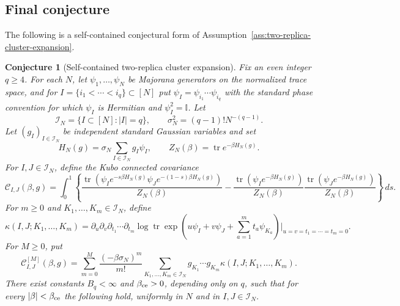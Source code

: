 \documentclass[11pt]{article}
\newtheorem{conjecture}[theorem]{Conjecture}
\newcommand{\tr}{\operatorname{tr}}
\newcommand{\I}{\mathbb{I}}
\newcommand{\calI}{\mathcal{I}}
\newcommand{\dd}{\,d}
\begin{document}
\subsection{Final conjecture}

The following is a self-contained conjectural form of
Assumption~\ref{ass:two-replica-cluster-expansion}.

\begin{conjecture}[Self-contained two-replica cluster expansion]
  \label{conj:self-contained-two-replica-cluster}
  Fix an even integer $q\geq4$.  For each $N$, let
  $\psi_1,\ldots,\psi_N$ be Majorana generators on the normalized trace space,
  and for $I=\{i_1<\cdots<i_q\}\subset[N]$ put
  $\psi_I=\psi_{i_1}\cdots\psi_{i_q}$ with the standard phase convention for
  which $\psi_I$ is Hermitian and $\psi_I^2=\I$.  Let
  \begin{equation}\label{eq:final-conj-index-set}
    \calI_N=\{I\subset[N]:|I|=q\},
    \qquad
    \sigma_N^2=(q-1)!N^{-(q-1)}.
  \end{equation}
  Let $(g_I)_{I\in\calI_N}$ be independent standard Gaussian variables and set
  \begin{equation}\label{eq:final-conj-hamiltonian}
    H_N(g)=\sigma_N\sum_{I\in\calI_N}g_I\psi_I,
    \qquad
    Z_N(\beta)=\tr e^{-\beta H_N(g)}.
  \end{equation}
  For $I,J\in\calI_N$, define the Kubo connected covariance
  \begin{equation}\label{eq:final-conj-kubo}
    \mathcal C_{I,J}(\beta,g)
    =
    \int_0^1
    \left\{
      \frac{
        \tr\left(\psi_I e^{-s\beta H_N(g)}
        \psi_J e^{-(1-s)\beta H_N(g)}\right)
      }{Z_N(\beta)}
      -
      \frac{\tr(\psi_Ie^{-\beta H_N(g)})}{Z_N(\beta)}
      \frac{\tr(\psi_Je^{-\beta H_N(g)})}{Z_N(\beta)}
    \right\}
    \dd s.
  \end{equation}
  For $m\geq0$ and $K_1,\ldots,K_m\in\calI_N$, define
  \begin{equation}\label{eq:final-conj-kappa}
    \kappa(I,J;K_1,\ldots,K_m)
    =
    \partial_u\partial_v\partial_{t_1}\cdots\partial_{t_m}
    \log\tr\exp\left(
      u\psi_I+v\psi_J+\sum_{a=1}^m t_a\psi_{K_a}
    \right)\bigg|_{u=v=t_1=\cdots=t_m=0}.
  \end{equation}
  For $M\geq0$, put
  \begin{equation}\label{eq:final-conj-truncation}
    \mathcal C^{[M]}_{I,J}(\beta,g)
    =
    \sum_{m=0}^M
    \frac{(-\beta\sigma_N)^m}{m!}
    \sum_{K_1,\ldots,K_m\in\calI_N}
    g_{K_1}\cdots g_{K_m}
    \kappa(I,J;K_1,\ldots,K_m).
  \end{equation}
  There exist constants $B_q<\infty$ and $\beta_{\rm ce}>0$, depending only on
  $q$, such that for every $|\beta|<\beta_{\rm ce}$ the following hold,
  uniformly in $N$ and in $I,J\in\calI_N$.


\end{conjecture}
\end{document}
